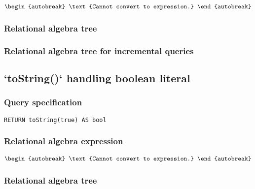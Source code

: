 \begin{align*}
\begin{autobreak}
\text{Cannot convert to expression.}
\end{autobreak}
\end{align*}

\subsubsection*{Relational algebra tree}


\subsubsection*{Relational algebra tree for incremental queries}


\subsection{`toString()` handling boolean literal}

\subsubsection*{Query specification}

\begin{lstlisting}
RETURN toString(true) AS bool
\end{lstlisting}

\subsubsection*{Relational algebra expression}

\begin{align*}
\begin{autobreak}
\text{Cannot convert to expression.}
\end{autobreak}
\end{align*}

\subsubsection*{Relational algebra tree}


